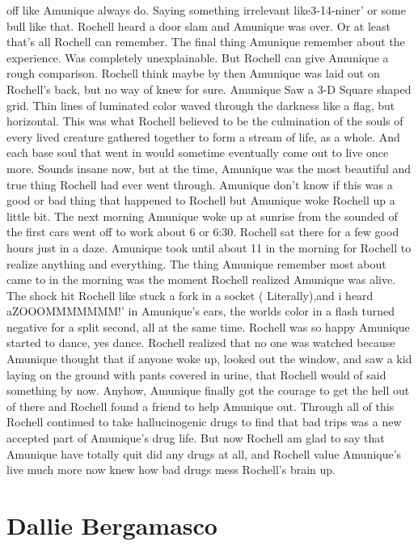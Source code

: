 \documentclass[12pt]{book}
\begin{document}
off like Amunique always do. Saying something irrelevant like3-14-niner' or some bull like that. Rochell heard a door slam and Amunique was over. Or at least that's all Rochell can remember. The final thing Amunique remember about the experience. Was completely unexplainable. But Rochell can give Amunique a rough comparison. Rochell think maybe by then Amunique was laid out on Rochell's back, but no way of knew for sure. Amunique Saw a 3-D Square shaped grid. Thin lines of luminated color waved through the darkness like a flag, but horizontal. This was what Rochell believed to be the culmination of the souls of every lived creature gathered together to form a stream of life, as a whole. And each base soul that went in would sometime eventually come out to live once more. Sounds insane now, but at the time, Amunique was the most beautiful and true thing Rochell had ever went through. Amunique don't know if this was a good or bad thing that happened to Rochell but Amunique woke Rochell up a little bit. The next morning Amunique woke up at sunrise from the sounded of the first cars went off to work about 6 or 6:30. Rochell sat there for a few good hours just in a daze. Amunique took until about 11 in the morning for Rochell to realize anything and everything. The thing Amunique remember most about came to in the morning was the moment Rochell realized Amunique was alive. The shock hit Rochell like stuck a fork in a socket ( Literally),and i heard aZOOOMMMMMMM!' in Amunique's ears, the worlds color in a flash turned negative for a split second, all at the same time. Rochell was so happy Amunique started to dance, yes dance. Rochell realized that no one was watched because Amunique thought that if anyone woke up, looked out the window, and saw a kid laying on the ground with pants covered in urine, that Rochell would of said something by now. Anyhow, Amunique finally got the courage to get the hell out of there and Rochell found a friend to help Amunique out. Through all of this Rochell continued to take hallucinogenic drugs to find that bad trips was a new accepted part of Amunique's drug life. But now Rochell am glad to say that Amunique have totally quit did any drugs at all, and Rochell value Amunique's live much more now knew how bad drugs mess Rochell's brain up.






\chapter{Dallie Bergamasco}
\end{document}
